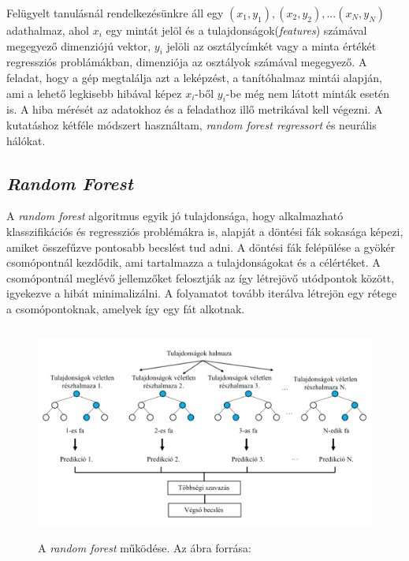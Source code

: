 \documentclass[12pt,letterpaper,oneside,openright]{book}
\begin{document}
\newline \indent
Felügyelt tanulásnál rendelkezésünkre áll egy $(x_1, y_1), (x_2, y_2),...(x_N, y_N)$ adathalmaz, ahol $x_i$ egy mintát jelöl és a tulajdonságok(\textit{features}) számával megegyező dimenziójú vektor, $y_i$ jelöli az osztálycímkét vagy a minta értékét regressziós problámákban, dimenziója az osztályok számával megegyező. A feladat, hogy a gép megtalálja azt a leképzést, a tanítóhalmaz mintái alapján, ami a lehető legkisebb hibával képez $x_i$-ből $y_i$-be még nem látott minták esetén is. A hiba mérését az adatokhoz és a feladathoz illő metrikával kell végezni. A kutatáshoz kétféle módszert használtam, \textit{random forest regressort} és neurális hálókat. 
\subsection{\textit{Random Forest}}
A \textit{random forest} algoritmus egyik jó tulajdonsága, hogy alkalmazható klasszifikációs és regressziós problémákra is, alapját a döntési fák sokasága képezi, amiket összefűzve pontosabb becslést tud adni. A döntési fák felépülése a gyökér csomópontnál kezdődik, ami tartalmazza a tulajdonságokat és a célértéket. A csomópontnál meglévő jellemzőket felosztják az így létrejövő utódpontok között, igyekezve a hibát minimalizálni. A folyamatot tovább iterálva létrejön egy rétege a csomópontoknak, amelyek így egy fát alkotnak. 
\begin{figure}[h!]
\centering
\includegraphics[height=70mm]{Figures/rf2.png}
\caption[RF]{A \textit{random forest} működése. Az ábra forrása:\cite{rfp}}
\end{figure}
\end{document}

